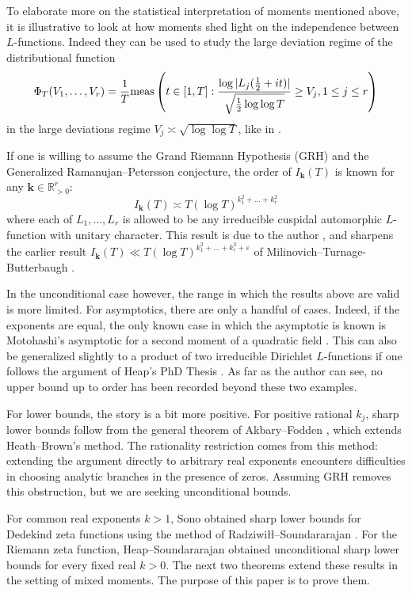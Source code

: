 \documentclass[oneside, 12pt]{amsart}
\theoremstyle{definition}
\begin{document}
	
	To elaborate more on the statistical interpretation of moments mentioned above, it is illustrative to look at how moments shed light on the independence between $L$-functions. Indeed they can be used to study the large deviation regime of the distributional function $$\Phi_T(V_1,\dots,V_r) = \frac{1}{T}\textup{meas}\left( t \in [1,T] : \frac{\log|L_j(\tfrac12+it)|}{\sqrt{\frac12 \log \log T}}\geq V_j, 1\leq j \leq r\right)$$ in the large deviations regime $V_j \asymp \sqrt{\log\log T}$, like in \cite[Theorem 1.3]{Hagen1}. 
	
	If one is willing to assume the Grand Riemann Hypothesis (GRH) and the Generalized Ramanujan--Petersson conjecture, the order of $I_{\boldsymbol{k}}(T)$ is known for any $\boldsymbol{k}\in \mathbb{R}^r_{>0}$: $$I_{\boldsymbol{k}}(T)\asymp T(\log T)^{k_1^2+\dots+k_r^2}$$ where each of $L_1,\dots,L_r$ is allowed to be any irreducible cuspidal automorphic $L$-function with unitary character. This result is due to the author \cite{Hagen1}, and sharpens the earlier result $I_{\boldsymbol{k}}(T)\ll T(\log T)^{k_1^2+\dots+k_r^2+\varepsilon}$ of Milinovich--Turnage-Butterbaugh \cite{MilinoButter1}. 
	
	In the unconditional case however, the range in which the results above are valid is more limited. For asymptotics, there are only a handful of cases. Indeed, if the exponents are equal, the only known case in which the asymptotic is known is Motohashi's asymptotic for a second moment of a quadratic field \cite{Motohashi1}. This can also be generalized slightly to a product of two irreducible Dirichlet $L$-functions if one follows the argument of Heap's PhD Thesis \cite{Heap2}. As far as the author can see, no upper bound up to order has been recorded beyond these two examples.
	
	For lower bounds, the story is a bit more positive. For positive
	rational $k_j$, sharp lower bounds follow from the general theorem
	of Akbary--Fodden \cite{AkbaryFodden1}, which extends Heath--Brown's
	method. The rationality restriction comes from this method:
	extending the argument directly to arbitrary real exponents
	encounters difficulties in choosing analytic branches in the
	presence of zeros. Assuming GRH removes this obstruction,
	but we are seeking unconditional bounds.
	
	For common real exponents $k>1$, Sono \cite{Sono1} obtained sharp
	lower bounds for Dedekind zeta functions using the method of
	Radziwi\l\l--Soundararajan \cite{RS1}. For the Riemann zeta
	function, Heap--Soundararajan \cite{HeapSound1} obtained
	unconditional sharp lower bounds for every fixed real $k>0$. The next two theorems extend these results in the setting of mixed moments. The purpose of this paper is to prove them.
	
\end{document}
